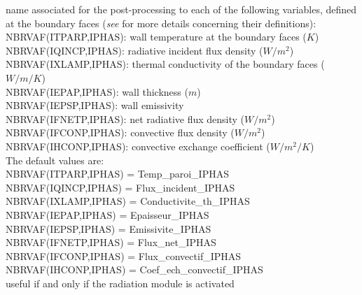 {name associated for the post-processing to each of the following variables,
defined at the boundary faces ({\it see}
\cite{Douce02} for more details concerning their definitions):\\
\hspace*{1.3cm} NBRVAF(ITPARP,IPHAS): wall temperature at the boundary
faces ($K$)\\
\hspace*{1.3cm} NBRVAF(IQINCP,IPHAS): radiative incident flux density
($W/m^2$)\\
\hspace*{1.3cm} NBRVAF(IXLAMP,IPHAS): thermal conductivity of the
boundary faces ($W/m/K$)\\
\hspace*{1.3cm} NBRVAF(IEPAP,IPHAS): wall thickness ($m$)\\
\hspace*{1.3cm} NBRVAF(IEPSP,IPHAS): wall emissivity \\
\hspace*{1.3cm} NBRVAF(IFNETP,IPHAS): net radiative flux density ($W/m^2$)\\
\hspace*{1.3cm} NBRVAF(IFCONP,IPHAS): convective flux density ($W/m^2$)\\
\hspace*{1.3cm} NBRVAF(IHCONP,IPHAS): convective exchange coefficient
($W/m^2/K$)\\
The default values are: \\
\hspace*{1.3cm} NBRVAF(ITPARP,IPHAS) = Temp\_paroi\_IPHAS \\
\hspace*{1.3cm} NBRVAF(IQINCP,IPHAS) = Flux\_incident\_IPHAS \\
\hspace*{1.3cm} NBRVAF(IXLAMP,IPHAS) = Conductivite\_th\_IPHAS \\
\hspace*{1.3cm} NBRVAF(IEPAP,IPHAS)  = Epaisseur\_IPHAS \\
\hspace*{1.3cm} NBRVAF(IEPSP,IPHAS)  = Emissivite\_IPHAS \\
\hspace*{1.3cm} NBRVAF(IFNETP,IPHAS) = Flux\_net\_IPHAS \\
\hspace*{1.3cm} NBRVAF(IFCONP,IPHAS) = Flux\_convectif\_IPHAS \\
\hspace*{1.3cm} NBRVAF(IHCONP,IPHAS) = Coef\_ech\_convectif\_IPHAS \\
useful if and only if the radiation module is activated}

